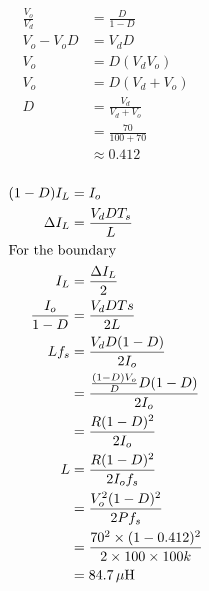 \subsection{}

\begin{center}

\end{center}

\subsubsection{}

\begin{align*}
\frac{V_o}{V_d} & = \frac{D}{1-D} \\
V_o - V_o D & = V_d D \\
V_o & = D (V_d V_o) \\
V_o & = D(V_d+V_o) \\
D & = \frac{V_d}{V_d+V_o} \\
  & = \frac{70}{100+70} \\
  & \approx 0.412
\end{align*}

\subsubsection{}

\begin{align*}
(1-D)I_L & = I_o \\
\Delta I_L & = \frac{V_dDT_s}{L} \\
\intertext{For the boundary}
I_L & = \frac{\Delta I_L}{2} \\
\frac{I_o}{1-D} & = \frac{V_dDTs}{2L} \\
Lf_s & = \frac{V_d D (1-D)}{2I_o} \\
     & = \frac{\frac{(1-D)V_o}{D} D (1-D)}{2I_o} \\
     & = \frac{R(1-D)^2}{2I_o} \\
L    & = \frac{R(1-D)^2}{2I_of_s} \\
     & = \frac{V_o^2(1-D)^2}{2Pf_s} \\
     & = \frac{70^2 \times (1-0.412)^2}{2\times 100\times 100k} \\
     & = \unit[84.7]{\mu{}H}
\end{align*}

\subsubsection{}


